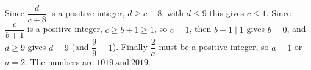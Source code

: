 Since $\dfrac{d}{c+8}$ is a positive integer, $d\ge c+8$; with $d\le9$ this gives $c\le1$. Since $\dfrac{c}{b+1}$ is a positive integer, $c\ge b+1\ge1$, so $c=1$, then $b+1\mid1$ gives $b=0$, and $d\ge9$ gives $d=9$ (and $\dfrac{9}{9}=1$). Finally $\dfrac{2}{a}$ must be a positive integer, so $a=1$ or $a=2$. The numbers are $\boxed{1019\ \text{and}\ 2019}$.
